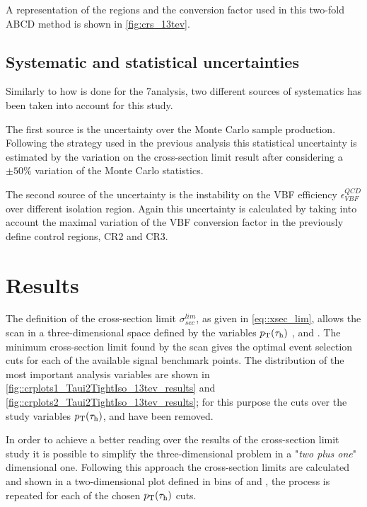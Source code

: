 A representation of the regions and the conversion factor used in this two-fold ABCD method is shown in \autoref{fig:crs_13tev}.

\subsection{Systematic and statistical uncertainties}

Similarly to how is done for the 7\tev analysis, two different sources of systematics has been taken into account for this study. 

The first source is the uncertainty over the Monte Carlo sample production. Following the strategy used in the previous analysis this statistical uncertainty is estimated by the variation on the cross-section limit result after considering a $\pm 50\%$ variation of the Monte Carlo statistics.

The second source of the uncertainty is the instability on the VBF efficiency $\epsilon^{QCD}_{VBF}$ over different \hadtau isolation region. Again this uncertainty is calculated by taking into account the maximal variation of the VBF conversion factor in the previously define control regions, CR2 and CR3.

\section{Results}

The definition of the cross-section limit $\sigma^{lim}_{sec}$, as given in \autoref{eq::xsec_lim}, allows the scan in a three-dimensional space defined by the variables $p_{\text{T}}(\tau_{\text{h}})$ , \mjj and \met. The minimum cross-section limit found by the scan gives the optimal event selection cuts for each of the available signal benchmark points. The distribution of the most important analysis variables are shown in \autoref{fig::crplots1_Taui2TightIso_13tev_results} and \autoref{fig::crplots2_Taui2TightIso_13tev_results}; for this purpose the cuts over the study variables $p_{\text{T}}(\tau_{\text{h}})$, \mjj and \met have been removed. 

In order to achieve a better reading over the results of the cross-section limit study it is possible to simplify the three-dimensional problem in a "\textit{two plus one}" dimensional one. Following this approach the cross-section limits are calculated and shown in a two-dimensional plot defined in bins of \mjj and \met, the process is repeated for each of the chosen $p_{\text{T}}(\tau_{\text{h}})$ cuts.

